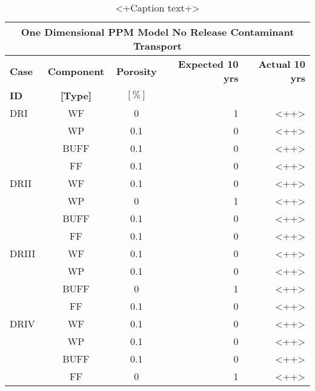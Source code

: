 \begin{table}
\centering
\begin{tabularx}{\textwidth}{|X|c|c|r|r|}
  \multicolumn{5}{c}{\textbf{One Dimensional PPM Model No Release Contaminant Transport}} \\
  \hline
  \textbf{Case}  &  \textbf{Component} &  \textbf{Porosity} & \textbf{Expected 10 yrs} & \textbf{Actual 10 yrs} \\
  \textbf{ID}    & \textbf{[Type]} &      $[\%]$            &                          &  \\
  \hline
  DRI     &  WF    &  0   & 1 & <++> \\
          &  WP    &  0.1 & 0 & <++> \\
          &  BUFF  &  0.1 & 0 & <++> \\
          &  FF    &  0.1 & 0 & <++> \\
  \hline
  DRII    &  WF    &  0.1 & 0 & <++> \\
          &  WP    &  0   & 1 & <++> \\
          &  BUFF  &  0.1 & 0 & <++> \\
          &  FF    &  0.1 & 0 & <++> \\
  \hline
  DRIII   &  WF    &  0.1 & 0 & <++> \\
          &  WP    &  0.1 & 0 & <++> \\
          &  BUFF  &  0   & 1 & <++> \\
          &  FF    &  0.1 & 0 & <++> \\
  \hline
  DRIV    &  WF    &  0.1 & 0 & <++> \\
          &  WP    &  0.1 & 0 & <++> \\
          &  BUFF  &  0.1 & 0 & <++> \\
          &  FF    &  0   & 1 & <++> \\
  \hline
\end{tabularx}
\caption{<+Caption text+>}
\label{tab:<+label+>}
\end{table}
